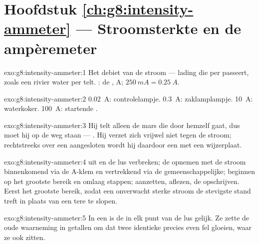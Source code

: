 \section*{Hoofdstuk \ref{ch:g8:intensity-ammeter} --- Stroomsterkte en de ampèremeter}

\begin{solution}{exo:g8:intensity-ammeter:1}
Het debiet van de stroom --- lading die per  passeert, zoals een
rivier water per  telt. : de
, \unit{A}; $\qty{250}{mA} = \qty{0.25}{A}$.
\end{solution}

\begin{solution}{exo:g8:intensity-ammeter:2}
\qty{0.02}{A}: controlelampje. \qty{0.3}{A}:
zaklamplampje. \qty{10}{A}: waterkoker. \qty{100}{A}: startende
.
\end{solution}

\begin{solution}{exo:g8:intensity-ammeter:3}
Hij telt alleen de mars die door hemzelf gaat, dus moet hij op de weg
staan --- . Hij verzet zich vrijwel niet tegen de stroom;
rechtstreeks over een  aangesloten wordt hij daardoor een
 met een wijzerplaat.
\end{solution}

\begin{solution}{exo:g8:intensity-ammeter:4}
 uit en de lus verbreken; de  opnemen met de
stroom binnenkomend via de \unit{A}-klem en vertrekkend via de
gemeenschappelijke; beginnen op het grootste bereik en omlaag stappen;
aanzetten, aflezen, de  opschrijven. Eerst het grootste
bereik, zodat een onverwacht sterke stroom de stevigste stand treft in
plaats van een tere te slopen.
\end{solution}

\begin{solution}{exo:g8:intensity-ammeter:5}
In een  is de  in elk punt van
de lus gelijk. Ze zette de oude waarneming in getallen om dat twee
identieke   precies even fel gloeien, waar ze ook
zitten.
\end{solution}

